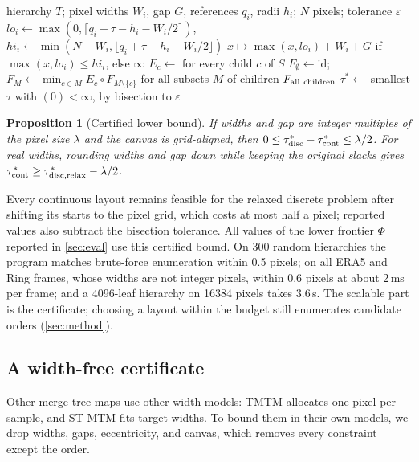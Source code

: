 \documentclass[review]{vgtc}                 %
\newtheorem{proposition}[theorem]{Proposition}
\begin{document}
\begin{algorithm}[t]
\caption{Certificate $\tau^*$ at display resolution (Theorem~\ref{thm:dp}).}\label{alg:cert}
\begin{algorithmic}[1]
\Require hierarchy $T$; pixel widths $W_i$, gap $G$, references $q_i$, radii $h_i$; $N$ pixels; tolerance $\varepsilon$
 
    \State $lo_i\gets\max(0,\lceil q_i-\tau-h_i-W_i/2\rceil)$, $hi_i\gets\min(N-W_i,\lfloor q_i+\tau+h_i-W_i/2\rfloor)$
    \State \Return $x\mapsto\max(x,lo_i)+W_i+G$ if $\max(x,lo_i)\le hi_i$, else $\infty$
  \EndIf
  \State $E_c\gets$  for every child $c$ of $S$
  \State $F_\emptyset\gets\mathrm{id}$;\ \ $F_M\gets\min_{c\in M}E_c\circ F_{M\setminus\{c\}}$ for all subsets $M$ of children
  \State \Return $F_{\rm all\ children}$ 
\EndFunction
\State $\tau^*\gets$ smallest $\tau$ with $(0)<\infty$, by bisection to $\varepsilon$
\end{algorithmic}
\end{algorithm}

\begin{proposition}[Certified lower bound]\label{prop:lb}
If widths and gap are integer multiples of the pixel size $\lambda$ and the canvas is grid-aligned, then $0\le\tau^*_{\rm disc}-\tau^*_{\rm cont}\le\lambda/2$. For real widths, rounding widths and gap \emph{down} while keeping the original slacks gives $\tau^*_{\rm cont}\ge\tau^*_{\rm disc,relax}-\lambda/2$.
\end{proposition}
Every continuous layout remains feasible for the relaxed discrete problem after shifting its starts to the pixel grid, which costs at most half a pixel; reported values also subtract the bisection tolerance. All values of the lower frontier $\Phi$ reported in \cref{sec:eval} use this certified bound. On 300 random hierarchies the program matches brute-force enumeration within 0.5 pixels; on all ERA5 and Ring frames, whose widths are not integer pixels, within 0.6 pixels at about 2\,ms per frame; and a 4096-leaf hierarchy on 16384 pixels takes 3.6\,s. The scalable part is the certificate; choosing a layout within the budget still enumerates candidate orders (\cref{sec:method}).

\subsection{A width-free certificate}
Other merge tree maps use other width models: TMTM allocates one pixel per sample, and ST-MTM fits target widths. To bound them in their own models, we drop widths, gaps, eccentricity, and canvas, which removes every constraint except the order.
\end{document}
